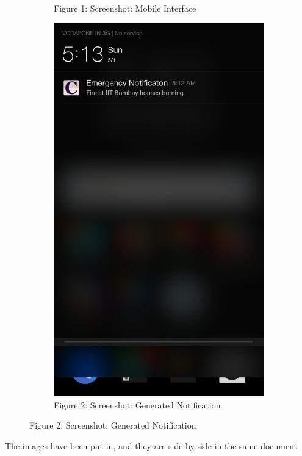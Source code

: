 \documentclass[12pt]{article}
\begin{document}
\begin{figure}[H]
\begin{subfigure}[t]{0.37\textwidth}
    \caption*{Figure 1: Screenshot: Mobile Interface}
    \label{fig:1}
  \end{subfigure}
  \begin{subfigure}[t]{0.37\textwidth}
    \includegraphics[width=\textwidth]{2}
    \caption*{Figure 2: Screenshot: Generated Notification}
    \label{fig:2}
  \end{subfigure}
\end{figure}
The images have been put in, and they are side by side in the same document
\end{document}
